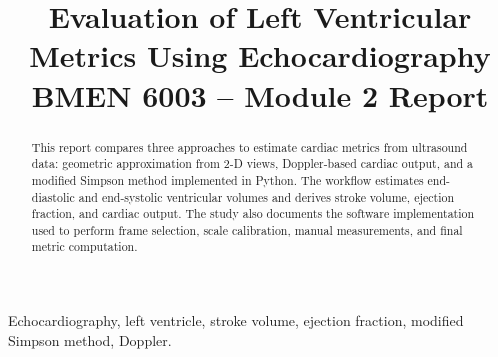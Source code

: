 \documentclass[conference]{IEEE-conference-template-062824/IEEEtran}
\title{Evaluation of Left Ventricular Metrics Using Echocardiography\\
\large BMEN 6003 -- Module 2 Report}
\author{\IEEEauthorblockN{Thomas Moulin}
\IEEEauthorblockA{Columbia University\\
New York, NY, USA\\
tmm2219}}
\begin{document}
\maketitle

\begin{abstract}
This report compares three approaches to estimate cardiac metrics from ultrasound data: geometric approximation from 2-D views, Doppler-based cardiac output, and a modified Simpson method implemented in Python. The workflow estimates end-diastolic and end-systolic ventricular volumes and derives stroke volume, ejection fraction, and cardiac output. The study also documents the software implementation used to perform frame selection, scale calibration, manual measurements, and final metric computation.
\end{abstract}

\begin{IEEEkeywords}
Echocardiography, left ventricle, stroke volume, ejection fraction, modified Simpson method, Doppler.
\end{IEEEkeywords}







\nocite{*}


\end{document}
